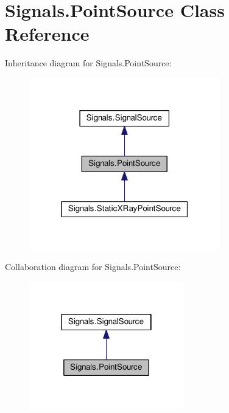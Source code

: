 \hypertarget{classSignals_1_1PointSource}{}\section{Signals.\+Point\+Source Class Reference}
\label{classSignals_1_1PointSource}


Inheritance diagram for Signals.\+Point\+Source\+:\nopagebreak
\begin{figure}[H]
\begin{center}
\leavevmode
\includegraphics[width=235pt]{classSignals_1_1PointSource__inherit__graph}
\end{center}
\end{figure}


Collaboration diagram for Signals.\+Point\+Source\+:\nopagebreak
\begin{figure}[H]
\begin{center}
\leavevmode
\includegraphics[width=190pt]{classSignals_1_1PointSource__coll__graph}
\end{center}
\end{figure}
